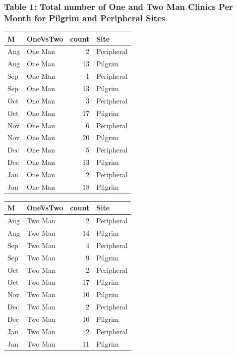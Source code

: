 \documentclass[]{article}
\begin{document}
\hypertarget{table-1-total-number-of-one-and-two-man-clinics-per-month-for-pilgrim-and-peripheral-sites}{%
\subsubsection{Table 1: Total number of One and Two Man Clinics Per
Month for Pilgrim and Peripheral
Sites}\label{table-1-total-number-of-one-and-two-man-clinics-per-month-for-pilgrim-and-peripheral-sites}}

\begin{table}

\centering
\begin{tabular}[t]{llrl}
\toprule
M & OneVsTwo & count & Site\\
\midrule
Aug & One Man & 2 & Peripheral\\
Aug & One Man & 13 & Pilgrim\\
Sep & One Man & 1 & Peripheral\\
Sep & One Man & 13 & Pilgrim\\
Oct & One Man & 3 & Peripheral\\
\addlinespace
Oct & One Man & 17 & Pilgrim\\
Nov & One Man & 6 & Peripheral\\
Nov & One Man & 20 & Pilgrim\\
Dec & One Man & 5 & Peripheral\\
Dec & One Man & 13 & Pilgrim\\
\addlinespace
Jan & One Man & 2 & Peripheral\\
Jan & One Man & 18 & Pilgrim\\
\bottomrule
\end{tabular}
\centering
\begin{tabular}[t]{llrl}
\toprule
M & OneVsTwo & count & Site\\
\midrule
Aug & Two Man & 2 & Peripheral\\
Aug & Two Man & 14 & Pilgrim\\
Sep & Two Man & 4 & Peripheral\\
Sep & Two Man & 9 & Pilgrim\\
Oct & Two Man & 2 & Peripheral\\
\addlinespace
Oct & Two Man & 17 & Pilgrim\\
Nov & Two Man & 10 & Pilgrim\\
Dec & Two Man & 2 & Peripheral\\
Dec & Two Man & 10 & Pilgrim\\
Jan & Two Man & 2 & Peripheral\\
\addlinespace
Jan & Two Man & 11 & Pilgrim\\
\bottomrule
\end{tabular}
\end{table}
\end{document}
